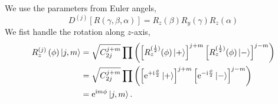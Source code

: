 We use the parameters from Euler angels, 
\begin{equation}
  D^{(j)} \left[ R\left( \gamma, \beta, \alpha \right) \right] = R_{z} \left( \beta \right) R_{y} \left( \gamma \right) R_{z} \left( \alpha \right)
\end{equation}
We fist handle the rotation along $z$-axis, 
\begin{equation}
\begin{aligned}
  R^{(j)}_{z} \left( \phi  \right) \ket{j,m} & = \sqrt{C_{2j}^{j+m}} \prod \left( \left[ R_{z}^{(\frac{1}{2})} (\phi) \ket{+}\right]^{j+m} \left[ R_{z}^{(\frac{1}{2})} (\phi) \ket{-}\right]^{j-m} \right)
  \\
  & = \sqrt{C_{2j}^{j+m}} \prod \left( \left[ \mathrm{e}^{+ \mathrm{i} \frac{\phi }{2}} \ket{+} \right]^{j+m} \left[ \mathrm{e}^{- \mathrm{i} \frac{\phi }{2}} \ket{-} \right]^{j-m}\right)
  \\
  & = \mathrm{e}^{\mathrm{i} m \phi } \ket{j, m}.
\end{aligned}
\end{equation}
